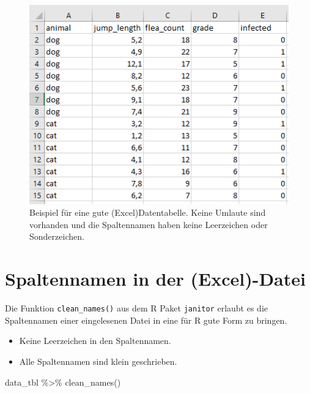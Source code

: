\documentclass[
  letterpaper,
  DIV=11,
  oneside]{scrreport}
\newenvironment{Shaded}{\begin{snugshade}}{\end{snugshade}}
\newcommand{\FunctionTok}[1]{\textcolor[rgb]{0.28,0.35,0.67}{#1}}
\newcommand{\NormalTok}[1]{\textcolor[rgb]{0.00,0.23,0.31}{#1}}
\newcommand{\SpecialCharTok}[1]{\textcolor[rgb]{0.37,0.37,0.37}{#1}}
\providecommand{\tightlist}{%
  \setlength{\itemsep}{0pt}\setlength{\parskip}{0pt}}\usepackage{longtable,booktabs,array}
\begin{document}
\begin{figure}

{\centering \includegraphics{./images/import_03.PNG}

}

\caption{\label{fig-imp-03}Beispiel für eine gute (Excel)Datentabelle.
Keine Umlaute sind vorhanden und die Spaltennamen haben keine
Leerzeichen oder Sonderzeichen.}

\end{figure}

\hypertarget{sec-spalten}{%
\section{Spaltennamen in der (Excel)-Datei}\label{sec-spalten}}

Die Funktion \texttt{clean\_names()} aus dem R Paket \texttt{janitor}
erlaubt es die Spaltennamen einer eingelesenen Datei in eine für R gute
Form zu bringen.

\begin{itemize}
\tightlist
\item
  Keine Leerzeichen in den Spaltennamen.
\item
  Alle Spaltennamen sind klein geschrieben.
\end{itemize}

\begin{Shaded}
\begin{Highlighting}[]
\NormalTok{data\_tbl }\SpecialCharTok{\%\textgreater{}\%} 
  \FunctionTok{clean\_names}\NormalTok{()}
\end{Highlighting}
\end{Shaded}
\end{document}
